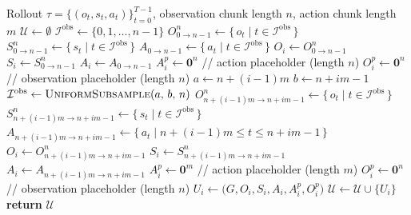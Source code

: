 \begin{algorithm}[t]
\caption{Trajectory splitting with variable-length action, observation, and robot state units.}
\label{alg:traj-splitting}
\begin{algorithmic}[1]
\REQUIRE Rollout $\tau = \{(o_t, s_t, a_t)\}_{t=0}^{T-1}$, observation chunk length $n$, action chunk length $m$
\STATE $\mathcal{U} \leftarrow \emptyset$
    \STATE $\mathcal{I}^{\text{obs}} \leftarrow \{0,1,\ldots,n-1\}$
    \STATE $O^{n}_{0 \rightarrow n-1} \leftarrow \{\,o_t \mid t \in \mathcal{I}^{\text{obs}}\,\}$
    \STATE $S^{n}_{0 \rightarrow n-1} \leftarrow \{\,s_t \mid t \in \mathcal{I}^{\text{obs}}\,\}$
    \STATE $A_{0 \rightarrow n-1} \leftarrow \{\,a_t \mid t \in \mathcal{I}^{\text{obs}}\,\}$
    \STATE $O_i \leftarrow O^{n}_{0 \rightarrow n-1}$
    \STATE $S_i \leftarrow S^{n}_{0 \rightarrow n-1}$
    \STATE $A_i \leftarrow A_{0 \rightarrow n-1}$
    \STATE $A^p_i \leftarrow \mathbf{0}^{n}$ \hfill // action placeholder (length $n$)
    \STATE $O^p_i \leftarrow \mathbf{0}^{n}$ \hfill // observation placeholder (length $n$)
  \ELSE
    \STATE $a \leftarrow n + (i-1)m$
    \STATE $b \leftarrow n + im - 1$
    \STATE $\mathcal{I}^{\text{obs}} \leftarrow \textsc{UniformSubsample}(a,\, b,\, n)$
    \STATE $O^{n}_{n+(i-1)m \rightarrow n+im-1} \leftarrow \{\,o_t \mid t \in \mathcal{I}^{\text{obs}}\,\}$
    \STATE $S^{n}_{n+(i-1)m \rightarrow n+im-1} \leftarrow \{\,s_t \mid t \in \mathcal{I}^{\text{obs}}\,\}$
    \STATE $A_{n+(i-1)m \rightarrow n+im-1} \leftarrow \{\,a_t \mid n+(i-1)m \le t \le n+im-1\,\}$
    \STATE $O_i \leftarrow O^{n}_{n+(i-1)m \rightarrow n+im-1}$
    \STATE $S_i \leftarrow S^{n}_{n+(i-1)m \rightarrow n+im-1}$
    \STATE $A_i \leftarrow A_{n+(i-1)m \rightarrow n+im-1}$
    \STATE $A^p_i \leftarrow \mathbf{0}^{m}$ \hfill // action placeholder (length $m$)
    \STATE $O^p_i \leftarrow \mathbf{0}^{n}$ \hfill // observation placeholder (length $n$)
  \ENDIF
  \STATE $U_i \leftarrow \bigl(G, O_i, S_i, A_i, A^p_i, O^p_i\bigr)$
  \STATE $\mathcal{U} \leftarrow \mathcal{U} \cup \{U_i\}$
\ENDFOR
\STATE \textbf{return} $\mathcal{U}$
\end{algorithmic}
\end{algorithm}

